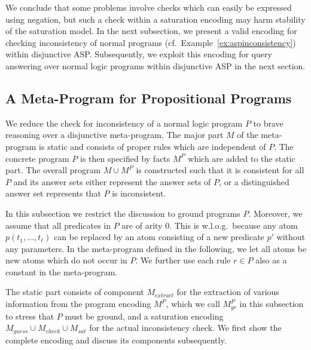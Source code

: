 \documentclass[11pt,fleqn,twoside]{article}
\newcommand{\Program}{\ensuremath{P}}
\begin{document}
			We conclude that some problems involve checks which can easily be expressed using negation,
			but such a check within a saturation encoding may harm stability of the saturation model.
			In the next subsection, we present a valid encoding for checking inconsistency of normal programs (cf.~Example~\ref{ex:aspinconsistency}) within disjunctive ASP.
			Subsequently, we exploit this encoding for query answering over normal logic programs within disjunctive ASP in the next section.
		
		\subsection{A Meta-Program for Propositional Programs}

			We reduce the check for inconsistency of a normal logic program $\Program$ to brave reasoning over a disjunctive meta-program.
			The major part $M$ of the meta-program is static and consists of proper rules which are independent of $\Program$. The concrete program $\Program$ is then specified
			by facts $M^P$ which are added to the static part. The overall program $M \cup M^P$ is constructed such that it is consistent for all $\Program$ and
			its answer sets either represent the answer sets of $\Program$, or a distinguished answer set represents that $\Program$ is inconsistent.
			
			In this subsection we restrict the discussion to ground programs $\Program$.
			Moreover, we assume that all predicates in $\Program$ are of arity $0$. This is w.l.o.g.~because any atom $p(t_1, \ldots, t_\ell)$ can be replaced by an atom consisting of a new predicate $p'$ without any parameters.
			In the meta-program defined in the following, we let all atoms be new atoms which do not occur in $\Program$. We further use each rule $r \in P$ also as a constant in the meta-program.

			The static part consists of component $M_{\mathit{extract}}$ for the extraction of various information from
			the program encoding $M^P$, which we call $M^P_{\mathit{gr}}$ in this subsection to stress that $\Program$ must be ground,
			and a saturation encoding $M_{\mathit{guess}} \cup M_{\mathit{check}} \cup M_{\mathit{sat}}$
			for the actual inconsistency check.
			We first show the complete encoding and discuss its components subsequently.
\end{document}
